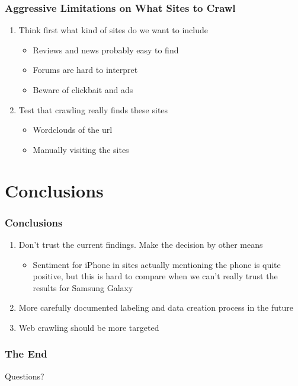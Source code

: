 \documentclass[10pt]{beamer}
\begin{document}
\begin{frame}
\frametitle{Aggressive Limitations on What Sites to Crawl}

\begin{enumerate}
    \item Think first what kind of sites do we want to include
    \begin{itemize}
        \item Reviews and news probably easy to find
        \pause
        \item Forums are hard to interpret
        \pause
        \item Beware of clickbait and ads
    \end{itemize}
    \pause
    \item Test that crawling really finds these sites
    \begin{itemize}
        \item Wordclouds of the url
        \pause
        \item Manually visiting the sites
    \end{itemize}
\end{enumerate}

\end{frame}

\section{Conclusions}

\begin{frame}
\frametitle{Conclusions}

\begin{enumerate}
    \item Don't trust the current findings. Make the decision by other means
    \pause
    \begin{itemize}
        \item Sentiment for iPhone in sites actually mentioning the phone is quite positive,
        but this is hard to compare when we can't really trust the results for Samsung Galaxy
    \end{itemize}
    \pause
    \item More carefully documented labeling and data creation process in the future
    \pause
    \item Web crawling should be more targeted
\end{enumerate}

\end{frame}

\begin{frame}
\frametitle{The End}

\LARGE{\centerline{Questions?}}

\end{frame}

\end{document}
